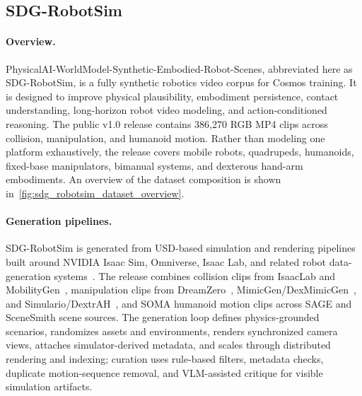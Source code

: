 \subsection{SDG-RobotSim}
\label{appendix:sdg_robotsim}

\paragraph{Overview.}
\label{appendix:sdg_robotsim_overview}
PhysicalAI-WorldModel-Synthetic-Embodied-Robot-Scenes, abbreviated here as SDG-RobotSim, is a fully synthetic robotics video corpus for Cosmos training. It is designed to improve physical plausibility, embodiment persistence, contact understanding, long-horizon robot video modeling, and action-conditioned reasoning. The public v1.0 release contains 386{,}270 RGB MP4 clips across collision, manipulation, and humanoid motion. Rather than modeling one platform exhaustively, the release covers mobile robots, quadrupeds, humanoids, fixed-base manipulators, bimanual systems, and dexterous hand-arm embodiments. An overview of the dataset composition is shown in~\cref{fig:sdg_robotsim_dataset_overview}.



\paragraph{Generation pipelines.}
\label{appendix:sdg_robotsim_generation_pipelines}
\label{appendix:sdg_robotsim_simulation_setup}
SDG-RobotSim is generated from USD-based simulation and rendering pipelines built around NVIDIA Isaac Sim, Omniverse, Isaac Lab, and related robot data-generation systems~\citep{nvidia_isaac_sim_2026,nvidia_gr00t_mimic_blueprint_2026}. The release combines collision clips from IsaacLab and MobilityGen~\citep{nvidia_mobilitygen_2026}, manipulation clips from DreamZero~\citep{ye2026dreamzero}, MimicGen/DexMimicGen~\citep{mandlekar2023mimicgen,jiang2025dexmimicgen}, and Simulario/DextrAH~\citep{nvidia_dextrah_2026}, and SOMA humanoid motion clips across SAGE \citep{xia2026sage} and SceneSmith scene sources. The generation loop defines physics-grounded scenarios, randomizes assets and environments, renders synchronized camera views, attaches simulator-derived metadata, and scales through distributed rendering and indexing; curation uses rule-based filters, metadata checks, duplicate motion-sequence removal, and VLM-assisted critique for visible simulation artifacts.


